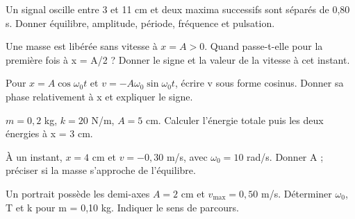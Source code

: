 \begin{questions}
\item Un signal oscille entre 3 et 11 cm et deux maxima successifs sont séparés de 0,80 s. Donner équilibre, amplitude, période, fréquence et pulsation.
\end{questions}

\begin{questions}
\item Une masse est libérée sans vitesse à $x=A>0$. Quand passe-t-elle pour la première fois à x = A/2 ? Donner le signe et la valeur de la vitesse à cet instant.
\end{questions}

\begin{questions}
\item Pour $x=A\cos\omega_0t$ et $v=-A\omega_0\sin\omega_0t$, écrire v sous forme cosinus. Donner sa phase relativement à x et expliquer le signe.
\end{questions}



\begin{questions}
\item $m=0{,}2$ kg, $k=20$ N/m, $A=5$ cm. Calculer l’énergie totale puis les deux énergies à x = 3 cm.
\end{questions}

\begin{questions}
\item À un instant, $x=4$ cm et $v=-0{,}30$ m/s, avec $\omega_0=10$ rad/s. Donner A ; préciser si la masse s’approche de l’équilibre.
\end{questions}

\begin{questions}
\item Un portrait possède les demi-axes $A=2$ cm et $v_{\max}=0{,}50$ m/s. Déterminer $\omega_0$, T et k pour m = 0,10 kg. Indiquer le sens de parcours.
\end{questions}



